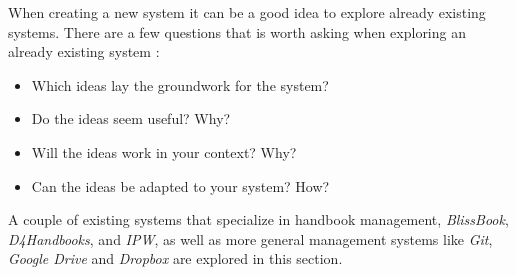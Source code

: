 When creating a new system it can be a good idea to explore already existing systems.
There are a few questions that is worth asking when exploring an already existing system \citep[p.~33]{Rod-Aalborg}:

\begin{itemize}
  \item Which ideas lay the groundwork for the system?
  \item Do the ideas seem useful? Why?
  \item Will the ideas work in your context? Why?
  \item Can the ideas be adapted to your system? How?
\end{itemize}  

A couple of existing systems that specialize in handbook management, \textit{BlissBook}, \textit{D4Handbooks}, and \textit{IPW}, as well as more general management systems like \textit{Git}, \textit{Google Drive} and \textit{Dropbox} are explored in this section.
